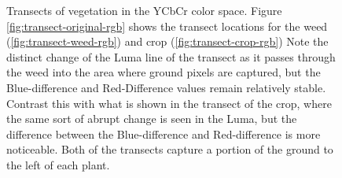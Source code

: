 \documentclass[letterpaper]{article}
\begin{document}
{\begin{figure}[h]
	\centering
	\hfill
	\hfill
	\caption[YCbCr Transects]{Transects of vegetation in the YCbCr color space. Figure \ref{fig:transect-original-rgb} shows the transect locations for the weed (\ref{fig:transect-weed-rgb}) and crop (\ref{fig:transect-crop-rgb}) Note the distinct change of the Luma line of the transect as it passes through the weed into the area where ground pixels are captured, but the Blue-difference and Red-Difference values remain relatively stable. Contrast this with what is shown in the transect of the crop, where the same sort of abrupt change is seen in the Luma, but the difference between the Blue-difference and Red-difference is more noticeable. Both of the transects capture a portion of the ground to the left of each plant.}
	\label{fig:transects-ycbcr}
\end{figure}


}
\end{document}
